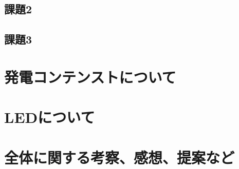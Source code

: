 \documentclass[11pt]{ltjsarticle}
\begin{document}
	\subsection{課題2}
		
	\subsection{課題3}
\section{発電コンテンストについて}
\section{LEDについて}
\section{全体に関する考察、感想、提案など}
\end{document}
